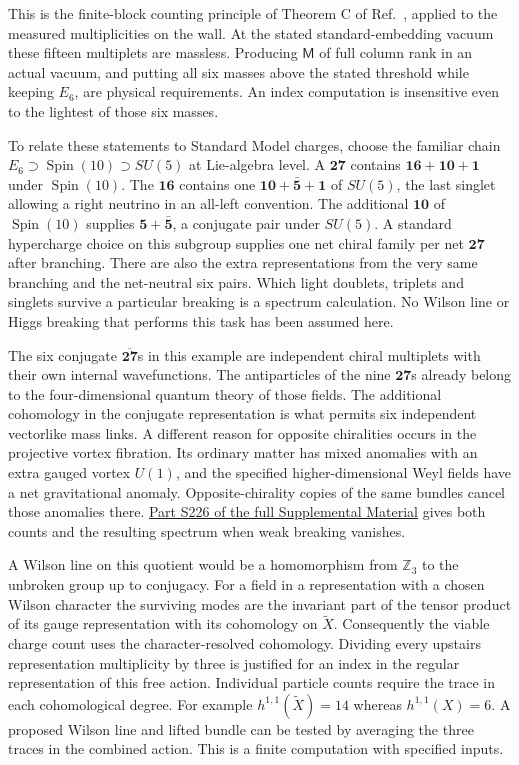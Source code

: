 \documentclass[aps,prd,reprint,onecolumn,nofootinbib,amsmath,amssymb]{revtex4-2}
\begin{document}
This is the finite-block counting principle of Theorem C of Ref.~\cite{towerlesspaper}, applied to the measured multiplicities on the wall. At the stated standard-embedding vacuum these fifteen multiplets are massless. Producing $\mathsf M$ of full column rank in an actual vacuum, and putting all six masses above the stated threshold while keeping $E_6$, are physical requirements. An index computation is insensitive even to the lightest of those six masses.

To relate these statements to Standard Model charges, choose the familiar chain $E_6\supset\operatorname{Spin}(10)\supset SU(5)$ at Lie-algebra level. A $\mathbf{27}$ contains $\mathbf{16}+\mathbf{10}+\mathbf1$ under $\operatorname{Spin}(10)$. The $\mathbf{16}$ contains one $\mathbf{10}+\bar{\mathbf5}+\mathbf1$ of $SU(5)$, the last singlet allowing a right neutrino in an all-left convention. The additional $\mathbf{10}$ of $\operatorname{Spin}(10)$ supplies $\mathbf5+\bar{\mathbf5}$, a conjugate pair under $SU(5)$. A standard hypercharge choice on this subgroup supplies one net chiral family per net $\mathbf{27}$ after branching. There are also the extra representations from the very same branching and the net-neutral six pairs. Which light doublets, triplets and singlets survive a particular breaking is a spectrum calculation. No Wilson line or Higgs breaking that performs this task has been assumed here.

The six conjugate $\overline{\mathbf{27}}$s in this example are independent chiral multiplets with their own internal wavefunctions. The antiparticles of the nine $\mathbf{27}$s already belong to the four-dimensional quantum theory of those fields. The additional cohomology in the conjugate representation is what permits six independent vectorlike mass links. A different reason for opposite chiralities occurs in the projective vortex fibration. Its ordinary matter has mixed anomalies with an extra gauged vortex $U(1)$, and the specified higher-dimensional Weyl fields have a net gravitational anomaly. Opposite-chirality copies of the same bundles cancel those anomalies there. \href{supplemental.pdf}{Part S226 of the full Supplemental Material} gives both counts and the resulting spectrum when weak breaking vanishes.

A Wilson line on this quotient would be a homomorphism from $\mathbb Z_3$ to the unbroken group up to conjugacy. For a field in a representation with a chosen Wilson character the surviving modes are the invariant part of the tensor product of its gauge representation with its cohomology on $\widetilde X$. Consequently the viable charge count uses the character-resolved cohomology. Dividing every upstairs representation multiplicity by three is justified for an index in the regular representation of this free action. Individual particle counts require the trace in each cohomological degree. For example $h^{1,1}(\widetilde X)=14$ whereas $h^{1,1}(X)=6$. A proposed Wilson line and lifted bundle can be tested by averaging the three traces in the combined action. This is a finite computation with specified inputs.
\end{document}
